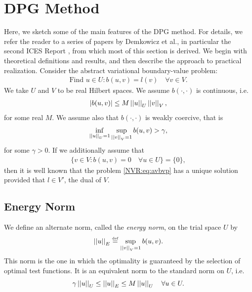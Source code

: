 \section{DPG Method}\label{NVR:sec:DPGintro}
Here, we sketch some of the main features of the DPG method.  For details, we refer the reader to a series of papers by Demkowicz et al., in particular the second ICES Report \cite{DPG2}, from which most of this section is derived.  We begin with theoretical definitions and results, and then describe the approach to practical realization.  Consider the abstract variational boundary-value problem:
\begin{align}
\text{Find } u \in U : b(u,v) = l(v) \quad \forall v \in V.\label{NVR:eq:avbvp}
\end{align}
We take $U$ and $V$ to be real Hilbert spaces.  We assume $b(\cdot,\cdot)$ is continuous, i.e.\
\begin{align}
|b(u,v)| \leq M \NVRnorm{u}_{U} \NVRnorm{v}_{V},
\end{align}
for some real $M$. We assume also that $b(\cdot,\cdot)$ is weakly coercive, that is
\begin{align}
\inf_{\NVRnorm{u}_{U}=1} \sup_{\NVRnorm{v}_{V}=1} b(u,v) > \gamma,
\end{align}
for some $\gamma > 0$.  If we additionally assume that
\begin{align}
\{v \in V : b(u,v)=0 \quad \forall u \in U\} = \{0\},
\end{align}
then it is well known that the problem \eqref{NVR:eq:avbvp} has a unique solution provided that $l \in V'$, the dual of $V$.

\subsection{Energy Norm}
We define an alternate norm, called the \emph{energy norm}, on the trial space $U$ by
\begin{equation}\label{NVR:eq:energyNorm}
\NVRnorm{u}_{E} \NVReqdef \sup_{\NVRnorm{v}_{V}=1} b(u,v).
\end{equation}
This norm is the one in which the optimality is guaranteed by the selection of optimal test functions. It is an equivalent norm to the standard norm on $U$, i.e.\
\begin{equation}
\gamma \NVRnorm{u}_{U} \leq \NVRnorm{u}_{E} \leq M \NVRnorm{u}_{U} \quad \forall u \in U.
\end{equation}

